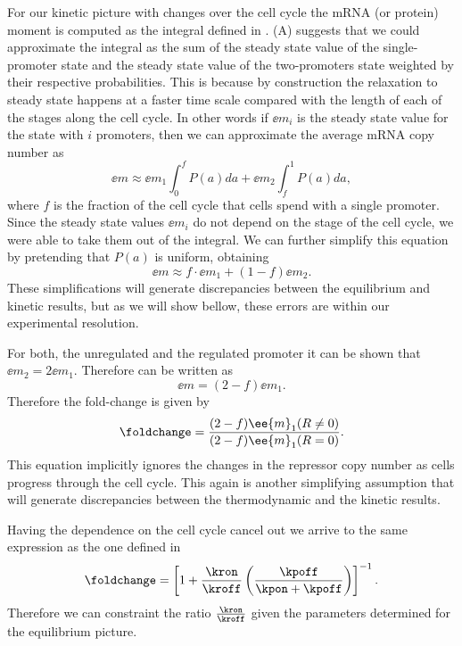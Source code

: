 For our kinetic picture with changes over the cell cycle the mRNA (or protein)
moment is computed as the integral defined in .
(A) suggests that we could approximate the integral
as the sum of the steady state value of the single-promoter state and the steady
state value of the two-promoters state weighted by their respective
probabilities. This is because by construction the relaxation to steady state
happens at a faster time scale compared with the length of each of the stages
along the cell cycle. In other words if $\ee{m}_i$ is the steady state value
for the state with $i$ promoters, then we can approximate the average mRNA copy
number as
\begin{equation}
  \ee{m} \approx \ee{m}_1 \int_0^{f} P(a)da +
                 \ee{m}_2 \int_f^{1} P(a)da,
\end{equation}
where $f$ is the fraction of the cell cycle that cells spend with a single
promoter. Since the steady state values $\ee{m}_i$ do not depend on the stage
of the cell cycle, we were able to take them out of the integral. We can further
simplify this equation by pretending that $P(a)$ is uniform, obtaining
\begin{equation}
  \ee{m} \approx f \cdot \ee{m}_1 + (1 - f) \ee{m}_2.
  \label{eq_mRNA_mean_simplified}
\end{equation}
These simplifications will generate discrepancies between the equilibrium and
kinetic results, but as we will show bellow, these errors are within our
experimental resolution.

For both, the unregulated and the regulated promoter it can be shown that
$\ee{m}_2 = 2 \ee{m}_1$. Therefore  can be written
as
\begin{equation}
  \ee{m} = (2 - f) \ee{m}_1.
\end{equation}
Therefore the fold-change is given by
\begin{equation}
  \foldchange = {(2 - f) \ee{m}_1(R \neq 0) \over (2 - f) \ee{m}_1(R = 0)}.
\end{equation}
This equation implicitly ignores the changes in the repressor copy number as
cells progress through the cell cycle. This again is another simplifying
assumption that will generate discrepancies between the thermodynamic and the
kinetic results.

Having the dependence on the cell cycle cancel out we arrive to the same
expression as the one defined in 
\begin{equation}
  \foldchange = \left[ 1 + {\kron \over \kroff}
                \left( {\kpoff \over \kpon + \kpoff} \right)\right]^{-1}.
\end{equation}
Therefore we can constraint the ratio ${\kron \over \kroff}$ given the
parameters determined for the equilibrium picture.


